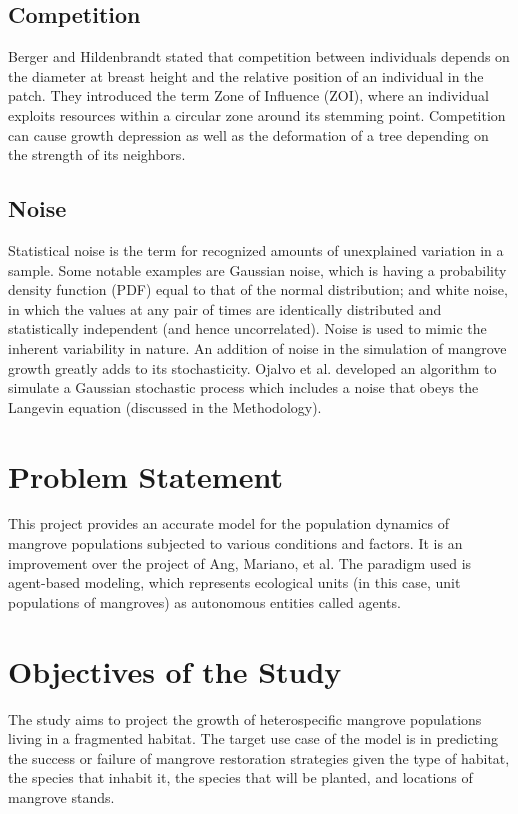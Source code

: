 \documentclass[12pt,letterpaper]{article}
\begin{document}
\subsection{Competition}
Berger and Hildenbrandt \cite{bergermangroves} stated that competition between individuals depends on the diameter at breast height and the relative position of an individual in the patch. They introduced the term Zone of Influence (ZOI), where an individual exploits resources within a circular zone around its stemming point. Competition can cause growth depression as well as the deformation	of a tree depending on the strength of its neighbors.

\subsection{Noise}
Statistical noise is the term for recognized amounts of unexplained variation in a sample.
Some notable examples are Gaussian noise, which is having a probability density function (PDF) equal to that of the normal distribution; and white noise, in which the values at any pair of times are identically distributed and statistically independent (and hence uncorrelated).
 Noise is used to mimic the 
inherent variability in nature. An addition of noise in the simulation of mangrove growth greatly
adds to its stochasticity. Ojalvo et al. \cite{ojalvoColoredNoise} developed an algorithm to simulate
a Gaussian stochastic process which includes a noise that obeys the Langevin equation (discussed in the Methodology).

\section{Problem Statement}
This project provides an accurate model for the population dynamics of mangrove
populations subjected to various conditions and factors. It is an improvement over
the project of Ang, Mariano, et al.\cite{mangrovesAngMariano}
The paradigm used is agent-based modeling, which represents ecological units (in this case, unit
populations of mangroves) as autonomous entities called agents.

\section{Objectives of the Study}
The study aims to project the growth of heterospecific mangrove populations	living in a fragmented habitat. The target use case of the model is in predicting the success or failure of mangrove restoration strategies given the type of habitat, the species that inhabit it, the species that will be planted, and locations of mangrove stands.
\end{document}
